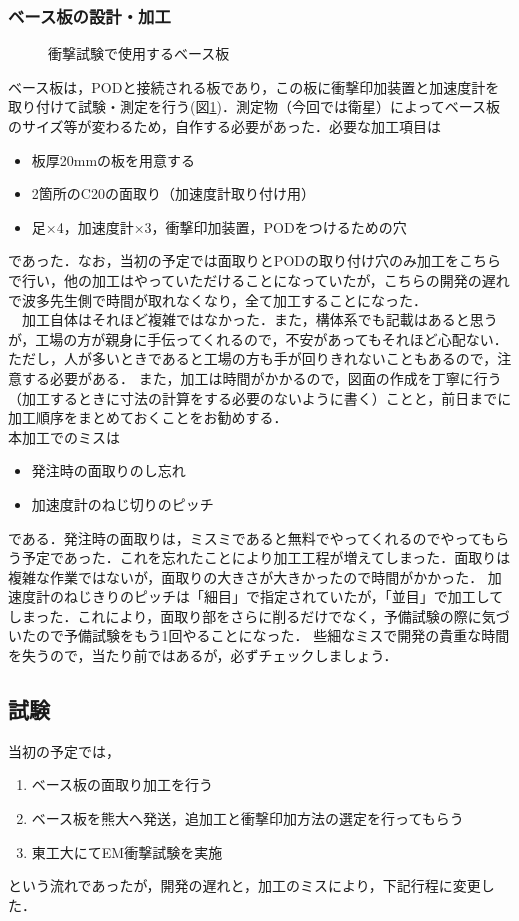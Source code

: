 \subsubsection{ベース板の設計・加工}
\begin{figure}[H]
	\centering
	\caption{衝撃試験で使用するベース板}
	\label{fig4-4-2}
\end{figure}
ベース板は，PODと接続される板であり，この板に衝撃印加装置と加速度計を取り付けて試験・測定を行う(図\ref{fig4-4-2})．測定物（今回では衛星）によってベース板のサイズ等が変わるため，自作する必要があった．必要な加工項目は
\begin{itemize}
 \item 板厚20mmの板を用意する
 \item 2箇所のC20の面取り（加速度計取り付け用）
 \item 足×4，加速度計×3，衝撃印加装置，PODをつけるための穴
\end{itemize}
であった．なお，当初の予定では面取りとPODの取り付け穴のみ加工をこちらで行い，他の加工はやっていただけることになっていたが，こちらの開発の遅れで波多先生側で時間が取れなくなり，全て加工することになった．\\
　加工自体はそれほど複雑ではなかった．また，構体系でも記載はあると思うが，工場の方が親身に手伝ってくれるので，不安があってもそれほど心配ない．ただし，人が多いときであると工場の方も手が回りきれないこともあるので，注意する必要がある．
また，加工は時間がかかるので，図面の作成を丁寧に行う（加工するときに寸法の計算をする必要のないように書く）ことと，前日までに加工順序をまとめておくことをお勧めする．\\
本加工でのミスは
\begin{itemize}
\item 発注時の面取りのし忘れ
\item 加速度計のねじ切りのピッチ
\end{itemize}
である．発注時の面取りは，ミスミであると無料でやってくれるのでやってもらう予定であった．これを忘れたことにより加工工程が増えてしまった．面取りは複雑な作業ではないが，面取りの大きさが大きかったので時間がかかった．
加速度計のねじきりのピッチは「細目」で指定されていたが，「並目」で加工してしまった．これにより，面取り部をさらに削るだけでなく，予備試験の際に気づいたので予備試験をもう1回やることになった．
些細なミスで開発の貴重な時間を失うので，当たり前ではあるが，必ずチェックしましょう．
\subsection{試験}
当初の予定では，
\begin{enumerate}
	\item ベース板の面取り加工を行う
	\item ベース板を熊大へ発送，追加工と衝撃印加方法の選定を行ってもらう
	\item 東工大にてEM衝撃試験を実施
\end{enumerate}
という流れであったが，開発の遅れと，加工のミスにより，下記行程に変更した．
